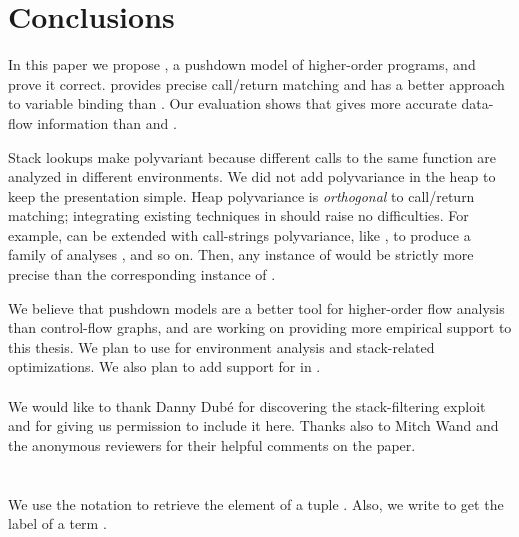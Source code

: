 \documentclass{LMCS}
\theoremstyle{definition} \newtheorem{property}[thm]{Property}
\begin{document}
\section{Conclusions\label{sec:conclusions}}

\noindent In this paper we propose \cfat{}, a pushdown model of higher-order programs,
and prove it correct.
\cfat{} provides precise call/return matching 
and has a better approach to variable binding than \kcfa{}.
Our evaluation shows that \cfat{} gives more accurate data-flow
information than  and .

Stack lookups make \cfat{} polyvariant because different calls to the same 
function are analyzed in different environments.
We did not add polyvariance in the heap to keep the presentation simple.
Heap polyvariance is \emph{orthogonal} to call/return matching; integrating
existing techniques \cite{diss/cmu/91/olin, conf/ecoop/95/agesen/cpa, 
journal/toplas/98/wright/polysplit} in \cfat{} should raise no difficulties.
For example, \cfat{} can be extended with call-strings polyvariance, like \kcfa,
to produce a family of analyses ,  and so on.
Then, any instance of  would be strictly more precise than the 
corresponding instance of \kcfa.

We believe that pushdown models are a better tool for higher-order flow analysis
than control-flow graphs,
and are working on providing more empirical support to this thesis.
We plan to use \cfat{} for environment analysis and stack-related optimizations.
We also plan to add support for  in \cfat{}. 

\paragraph{}
We would like to thank Danny Dub\'e for discovering the stack-filtering exploit
and for giving us permission to include it here.
Thanks also to Mitch Wand and the anonymous reviewers for their helpful comments
on the paper.



\clearpage
\appendix

\section{}

\noindent We use the notation  to retrieve the 
element of a tuple .
Also, we write  to get the label of a term .
\end{document}
